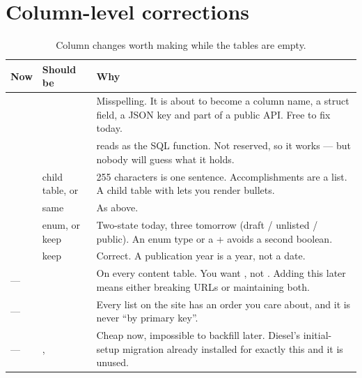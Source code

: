 \section{Column-level corrections}

\begin{table}[htbp]
\centering
\caption{Column changes worth making while the tables are empty.}
\label{tab:columns}
\small
\begin{tabular}{@{}L{0.30\textwidth}L{0.30\textwidth}L{0.34\textwidth}@{}}
\toprule
\textbf{Now} & \textbf{Should be} & \textbf{Why} \\
\midrule
{} &  & Misspelling. It is about to become a column
name, a struct field, a JSON key and part of a public API. Free to fix today.  \\
  &  &  reads as the SQL  function.
Not reserved, so it works --- but nobody will guess what it holds.  \\
 & child table, or  & 255 characters is one sentence.
Accomplishments are a list. A  child table with 
lets you render bullets.  \\
 & same & As above. \\
 &  enum, or keep & Two-state today, three tomorrow
(draft / unlisted / public). An enum type or a  +  avoids a second boolean. \\
 & keep & Correct. A publication year is a year, not a date. \\
--- &  & On every content table. You want
, not . Adding this later means either breaking
URLs or maintaining both. \\
--- &  & Every list on the site has an order you care
about, and it is never ``by primary key''. \\
--- & ,   & Cheap now, impossible to
backfill later. Diesel's initial-setup migration already installed
 for exactly this and it is unused. \\
\bottomrule
\end{tabular}
\end{table}

